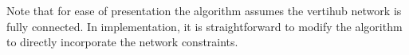Note that for ease of presentation the algorithm assumes the vertihub network is fully connected. In implementation, it is straightforward to modify the algorithm to directly incorporate the network constraints. 





